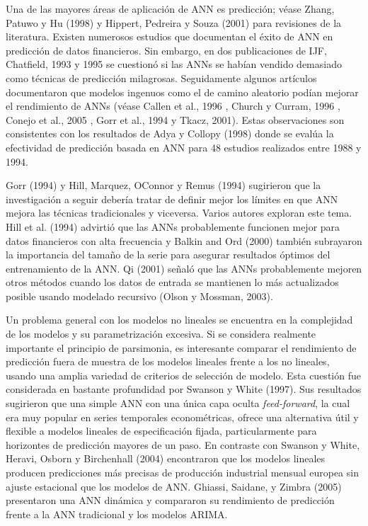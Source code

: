 \documentclass{llncs}
\begin{document}
Una de las mayores áreas de aplicación de ANN es predicción; véase Zhang, Patuwo y Hu (1998) \cite{Zhang199835} y Hippert, Pedreira y Souza (2001) \cite{Hippert200144} para revisiones de la literatura. Existen numerosos estudios que documentan el éxito de ANN en predicción de datos financieros. Sin embargo, en dos publicaciones de IJF, Chatfield, 1993 \cite{Chatfield19931} y 1995 \cite{Chatfield1995501} se cuestionó si las ANNs se habían vendido demasiado como técnicas de predicción milagrosas. Seguidamente algunos artículos documentaron que modelos ingenuos como el de camino aleatorio podían mejorar el rendimiento de ANNs (véase Callen et al., 1996 \cite{Callen1996475}, Church y Curram, 1996 \cite{Church1996255}, Conejo et al., 2005 \cite{Conejo2005435}, Gorr et al., 1994 \cite{Gorr199417} y Tkacz, 2001). Estas observaciones son consistentes con los resultados de Adya y Collopy (1998) donde se evalúa la efectividad de predicción basada en ANN para 48 estudios realizados entre 1988 y 1994.

Gorr (1994) y Hill, Marquez, OConnor y Remus (1994) sugirieron que la investigación a seguir debería tratar de definir mejor los límites en que ANN mejora las técnicas tradicionales y viceversa. Varios autores exploran este tema. Hill et al. (1994) advirtió que las ANNs probablemente funcionen mejor para datos financieros con alta frecuencia y Balkin and Ord (2000) también subrayaron la importancia del tamaño de la serie para asegurar resultados óptimos del entrenamiento de la ANN. Qi (2001) señaló que las ANNs probablemente mejoren otros métodos cuando los datos de entrada se mantienen lo más actualizados posible usando modelado recursivo (Olson y Mossman, 2003).

Un problema general con los modelos no lineales se encuentra en la complejidad de los modelos y su parametrización excesiva. Si se considera realmente importante el principio de parsimonia, es interesante comparar el rendimiento de predicción fuera de muestra de los modelos lineales frente a los no lineales, usando una amplia variedad de criterios de selección de modelo. Esta cuestión fue considerada en bastante profundidad por Swanson y White (1997). Sus resultados sugirieron que una simple ANN con una única capa oculta \emph{feed-forward}, la cual era muy popular en series temporales econométricas, ofrece una alternativa útil y flexible a modelos lineales de especificación fijada, particularmente para horizontes de predicción mayores de un paso. En contraste con Swanson y White, Heravi, Osborn y Birchenhall (2004) encontraron que los modelos lineales producen predicciones más precisas de producción industrial mensual europea sin ajuste estacional que los modelos de ANN. Ghiassi, Saidane, y Zimbra (2005) presentaron una ANN dinámica y compararon su rendimiento de predicción frente a la ANN tradicional y los modelos ARIMA.
\end{document}
